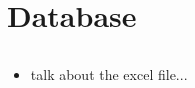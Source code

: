 \section{Database}
\subsection{}
\begin{itemize}
 \item talk about the excel file...
\end{itemize}


